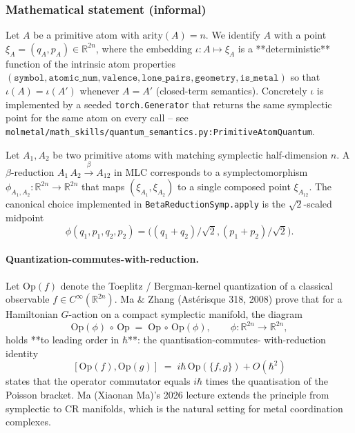 \subsubsection{Mathematical statement (informal)}
\label{sec:method:quantum-semantics-statement}

Let $A$ be a primitive atom with $\mathrm{arity}(A) = n$.
We identify $A$ with a point
$\xi_A = (q_A, p_A) \in \mathbb{R}^{2n}$, where the embedding
$\iota: A \mapsto \xi_A$ is a **deterministic** function of the
intrinsic atom properties
$(\texttt{symbol}, \texttt{atomic\_num}, \texttt{valence},
\texttt{lone\_pairs}, \texttt{geometry}, \texttt{is\_metal})$
so that $\iota(A) = \iota(A')$ whenever $A = A'$ (closed-term
semantics).  Concretely $\iota$ is implemented by a seeded
\texttt{torch.Generator} that returns the same symplectic point
for the same atom on every call -- see
\texttt{molmetal/math\_skills/quantum\_semantics.py:PrimitiveAtomQuantum}.

Let $A_1, A_2$ be two primitive atoms with matching symplectic
half-dimension $n$.  A $\beta$-reduction
$A_1 \, A_2 \xrightarrow{\beta} A_{12}$ in MLC corresponds to a
symplectomorphism
$\phi_{A_1, A_2}: \mathbb{R}^{2n} \to \mathbb{R}^{2n}$ that maps
$(\xi_{A_1}, \xi_{A_2})$ to a single composed point
$\xi_{A_{12}}$.  The canonical choice implemented in
\texttt{BetaReductionSymp.apply} is the $\sqrt{2}$-scaled
midpoint
\[
  \phi(q_1, p_1, q_2, p_2) = \bigl((q_1 + q_2)/\sqrt{2},
                                    (p_1 + p_2)/\sqrt{2}\bigr).
\]

\paragraph{Quantization-commutes-with-reduction.}
Let $\mathrm{Op}(f)$ denote the Toeplitz / Bergman-kernel
quantization of a classical observable
$f \in C^\infty(\mathbb{R}^{2n})$.  Ma \& Zhang (Astérisque 318, 2008)
prove that for a Hamiltonian $G$-action on a compact symplectic
manifold, the diagram
\begin{equation}
  \label{eq:qcr}
  \mathrm{Op}(\phi) \,\circ\, \mathrm{Op} \;=\; \mathrm{Op} \,\circ\, \mathrm{Op}(\phi),
  \qquad \phi: \mathbb{R}^{2n} \to \mathbb{R}^{2n},
\end{equation}
holds **to leading order in $\hbar$**: the quantisation-commutes-
with-reduction identity
\begin{equation}
  \label{eq:qcr-commutator}
  [\mathrm{Op}(f), \mathrm{Op}(g)]
   \;=\; i\hbar \, \mathrm{Op}(\{f, g\}) + O(\hbar^2)
\end{equation}
states that the operator commutator equals $i\hbar$ times the
quantisation of the Poisson bracket.  Ma (Xiaonan Ma)'s 2026
lecture extends the principle from symplectic to CR manifolds,
which is the natural setting for metal coordination complexes.

